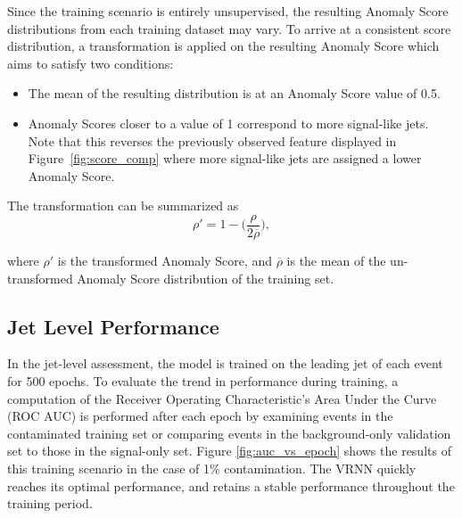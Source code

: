 \documentclass[11pt, a4paper]{article}
\begin{document}
Since the training scenario is entirely unsupervised, the resulting Anomaly Score distributions from each training dataset may vary. To arrive at a consistent score distribution, a transformation is applied on the resulting Anomaly Score which aims to satisfy two conditions:
\begin{itemize}
	\item{The mean of the resulting distribution is at an Anomaly Score value of 0.5.}
	\item{Anomaly Scores closer to a value of 1 correspond to more signal-like jets. Note that this reverses the previously observed feature displayed in Figure~\ref{fig:score_comp} where more signal-like jets are assigned a lower Anomaly Score.}
\end{itemize}

The transformation can be summarized as
\begin{equation}
\label{eq:transformation}
	\rho ' = 1 - \bigg(\frac{\rho}{2\overline{\rho}}\bigg),
\end{equation}

where $\rho '$ is the transformed Anomaly Score, and  $\overline{\rho}$ is the mean of the un-transformed Anomaly Score distribution of the training set.


\subsection{Jet Level Performance}


In the jet-level assessment, the model is trained on the leading jet of each event for 500 epochs. To evaluate the trend in performance during training, a computation of the Receiver Operating Characteristic's Area Under the Curve (ROC AUC) is performed after each epoch by examining events in the contaminated training set or comparing events in the background-only validation set to those in the signal-only set. Figure \ref{fig:auc_vs_epoch} shows the results of this training scenario in the case of 1\% contamination. The VRNN quickly reaches its optimal performance, and retains a stable performance throughout the training period. 
\end{document}
